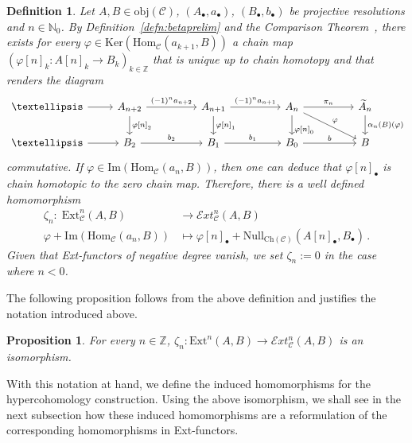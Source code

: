 \documentclass[12pt,a4paper]{article}
\numberwithin{equation}{section}
\newtheorem{prop}[thm]{Proposition}
\newtheorem{defn}[thm]{Definition}
\theoremstyle{nonumberplain}
\begin{document}
\begin{defn}\label{defn:extisoms}
Let $A, B \in \mathrm{obj}(\mathcal{C})$, $(A_{\bullet}, a_{\bullet})$, $(B_{\bullet}, b_{\bullet})$ be projective resolutions and $n \in \mathbb{N}_0$. By Definition~\ref{defn:betaprelim} and the Comparison Theorem~\cite[Theorem~2.2.6]{wei94}, there exists for every $\varphi \in \mathrm{Ker}(\mathrm{Hom}_{\mathcal{C}}(a_{k+1}, B))$ a chain map $(\varphi[n]_k: A[n]_k \rightarrow B_k)_{k \in \mathbb{Z}}$ that is unique up to chain homotopy and that renders the diagram
\begin{equation}\label{diag:lifttochainmap}
\begin{tikzcd}
    {} \dots {} \arrow[r] & A_{n+2} \arrow[rr, "(-1)^n a_{n+2}"] \arrow[d, "\varphi{[}n{]}_2"] & & A_{n+1} \arrow[rr, "(-1)^n a_{n+1}"] \arrow[d, "\varphi{[}n{]}_1"] & & A_n \arrow[rr, "\pi_n"] \arrow[drr, "\varphi"] \arrow[d, "\varphi{[}n{]}_0" near end] & & \widetilde{A}_n \arrow[d, "\alpha_n(B)(\varphi)"] \\
    {} \dots {} \arrow[r] & B_2 \arrow[rr, "b_2"] & & B_1 \arrow[rr, "b_1"] & & B_0 \arrow[rr, "b"] & & B
\end{tikzcd}
\end{equation}
commutative. If $\varphi \in \mathrm{Im}(\mathrm{Hom}_{\mathcal{C}}(a_n, B))$, then one can deduce that $\varphi[n]_{\bullet}$ is chain homotopic to the zero chain map. Therefore, there is a well defined homomorphism
\begin{align*}
\zeta_n: \; \mathrm{Ext}_{\mathcal{C}}^n(A, B) &\rightarrow \mathcal{E}xt_{\mathcal{C}}^n(A, B) \\
\varphi + \mathrm{Im}(\mathrm{Hom}_{\mathcal{C}}(a_n, B)) &\mapsto \varphi[n]_{\bullet} + \mathrm{Null}_{\mathrm{Ch}(\mathcal{C})}(A[n]_{\bullet}, B_{\bullet}) \, .
\end{align*}
Given that Ext-functors of negative degree vanish, we set $\zeta_n := 0$ in the case where $n < 0$.
\end{defn}

The following proposition follows from the above definition and justifies the notation introduced above.

\begin{prop}
For every $n \in \mathbb{Z}$, $\zeta_n: \mathrm{Ext}^n(A, B) \rightarrow \mathcal{E}xt_{\mathcal{C}}^n(A, B)$ is an isomorphism.
\end{prop}

With this notation at hand, we define the induced homomorphisms for the hypercohomology construction. Using the above isomorphism, we shall see in the next subsection how these induced homomorphisms are a reformulation of the corresponding homomorphisms in Ext-functors.
\end{document}
